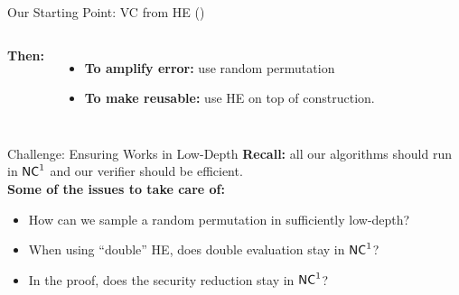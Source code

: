 \begin{frame}[t]{Our Starting Point: VC from HE (\cite{ckv10})}
	\onslide<2->
\begin{columns}
	\textbf{Then:}
	\begin{itemize}
		\item \textbf{To amplify error:} use random permutation
			\onslide<4->
		\item \textbf{To make reusable:} use HE  on top of construction.
	\end{itemize}
	
	\end{columns}
\end{frame}


\begin{frame}[t]{Challenge: Ensuring \cite{ckv10} Works in Low-Depth}
	\textbf{Recall:} all our algorithms should run in ${\mathsf{NC}}^1$ and our verifier should be efficient.\pause\\
	\bigskip
	\textbf{Some of the issues to take care of: }
	\begin{itemize}[<+- | alert@+>]
		\item How can we sample a random permutation in sufficiently low-depth?
		\item When using ``double'' HE, does double evaluation stay in ${\mathsf{NC}}^1$?
		\item In the proof, does the security reduction stay in ${\mathsf{NC}}^1$?
	\end{itemize}
\end{frame}

